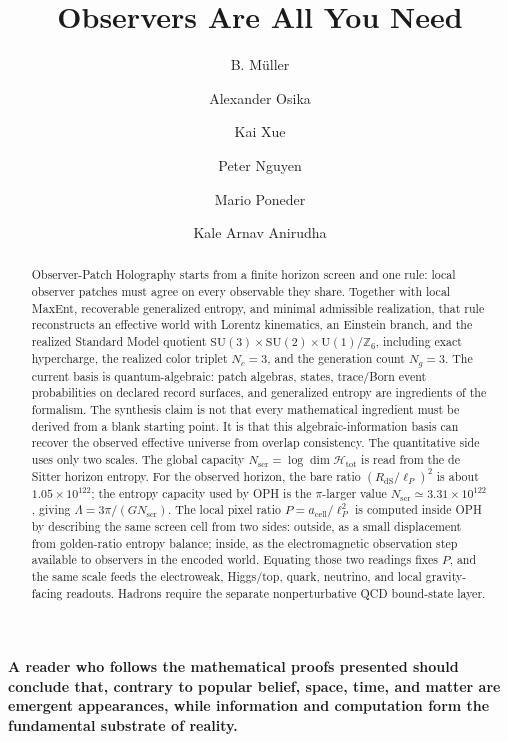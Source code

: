 \documentclass[11pt]{article}
\title{Observers Are All You Need}
\author{B. M\"uller \and Alexander Osika \and Kai Xue \and Peter Nguyen \and Mario Poneder \and Kale Arnav Anirudha}
\date{\OPHPaperReleaseDate}
\newcommand{\SU}{\mathrm{SU}}
\newcommand{\U}{\mathrm{U}}
\begin{document}
\maketitle
\OPHPaperReleaseBanner

\begin{abstract}
Observer-Patch Holography starts from a finite horizon screen and one rule: local observer
patches must agree on every observable they share. Together with local MaxEnt, recoverable
generalized entropy, and minimal admissible realization, that rule reconstructs an effective
world with Lorentz kinematics, an Einstein branch, and the realized Standard Model quotient
\(\SU(3)\times\SU(2)\times\U(1)/\mathbb Z_6\), including exact hypercharge, the realized color
triplet \(N_c=3\), and the generation count \(N_g=3\). The current basis is quantum-algebraic:
patch algebras, states, trace/Born event probabilities on declared record surfaces, and
generalized entropy are ingredients of the formalism. The synthesis claim is not that every
mathematical ingredient must be derived from a blank starting point. It is that this
algebraic-information basis can recover the observed effective universe from overlap
consistency. The quantitative side uses only two scales. The global capacity
\(N_{\mathrm{scr}}=\log\dim\mathcal H_{\mathrm{tot}}\) is read from the de Sitter horizon entropy. For the observed
horizon, the bare ratio \((R_{\mathrm{dS}}/\ell_P)^2\) is about \(1.05\times10^{122}\);
the entropy capacity used by OPH is the \(\pi\)-larger value \(N_{\mathrm{scr}}\simeq
3.31\times10^{122}\), giving \(\Lambda=3\pi/(G N_{\mathrm{scr}})\). The local pixel ratio
\(P=a_{\mathrm{cell}}/\ell_P^2\) is computed inside OPH by describing the same screen cell from two
sides: outside, as a small displacement from golden-ratio entropy balance; inside, as the
electromagnetic observation step available to observers in the encoded world. Equating those two
readings fixes \(P\), and the same scale feeds the electroweak, Higgs/top, quark, neutrino, and
local gravity-facing readouts. Hadrons require the separate nonperturbative QCD bound-state layer.
\end{abstract}

\begin{center}
\begin{minipage}{0.88\textwidth}
\centering
\bfseries
A reader who follows the mathematical proofs presented should conclude that, contrary to popular belief, space, time, and matter are emergent appearances, while information and computation form the fundamental substrate of reality.
\end{minipage}
\end{center}
	
\end{document}
